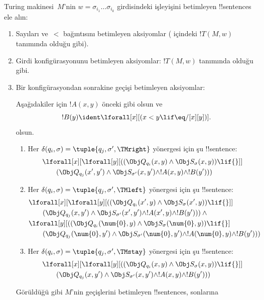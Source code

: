 Turing makinesi~$M$'nin $w=\sigma_{i_1}\dots\sigma_{i_k}$ girdisindeki
işleyişini betimleyen !!{sentence}s ele alın:
\begin{enumerate}
\item Sayıları ve~$<$ bağıntısını betimleyen aksiyomlar
( içindeki $!T(M,w)$ tanımında olduğu gibi).
\item Girdi konfigürasyonunu betimleyen aksiyomlar: $!T(M,w)$ tanımında
olduğu gibi.
\item Bir konfigürasyondan sonrakine geçişi betimleyen aksiyomlar:

Aşağıdakiler için $!A(x,y)$ önceki gibi olsun ve
\[
  !B(y) \ident \lforall[x][(x < y \lif \eq/[x][y])].
\]
olsun.
\begin{enumerate}
\item {} Her
$\delta(q_i,\sigma)=\tuple{q_j,\sigma',\TMright}$ yönergesi için şu
!!{sentence}:
\begin{align*}
& \lforall[x][\lforall[y][(
   (\Obj Q_{q_i}(x, y) \land \Obj S_{\sigma}(x, y)) \lif {}]] \\
&\qquad   (\Obj Q_{q_j}(x', y') \land \Obj S_{\sigma'}(x, y') \land
!A(x, y) \land !B(y')))
\end{align*}
\item {} Her
$\delta(q_i,\sigma)=\tuple{q_j,\sigma',\TMleft}$ yönergesi için şu
!!{sentence}:
\begin{align*}
& \lforall[x][\lforall[y][
    ((\Obj Q_{q_i}(x', y) \land \Obj S_{\sigma}(x', y)) \lif {}]]\\
& \qquad   (\Obj Q_{q_j}(x, y') \land \Obj S_{\sigma'}(x', y') \land
!A(x', y) \land !B(y'))) \land {}\\
& \lforall[y][((\Obj Q_{q_i}(\num{0}, y) \land \Obj S_{\sigma}(\num{0},
    y)) \lif {}]\\
& \qquad (\Obj Q_{q_j}(\num{0}, y') \land \Obj S_{\sigma'}(\num{0},
  y') \land !A(\num{0}, y) \land !B(y')))
\end{align*}
\item {} Her
$\delta(q_i,\sigma)=\tuple{q_j,\sigma',\TMstay}$ yönergesi için şu
!!{sentence}:
\begin{align*}
& \lforall[x][\lforall[y][(
   (\Obj Q_{q_i}(x, y) \land \Obj S_{\sigma}(x, y)) \lif {}]] \\
&\qquad (\Obj Q_{q_j}(x, y') \land \Obj S_{\sigma'}(x, y') \land
!A(x, y) \land !B(y')))
\end{align*}
\end{enumerate}
Görüldüğü gibi $M$'nin geçişlerini betimleyen !!{sentence}s, sonlarına

\end{enumerate}
